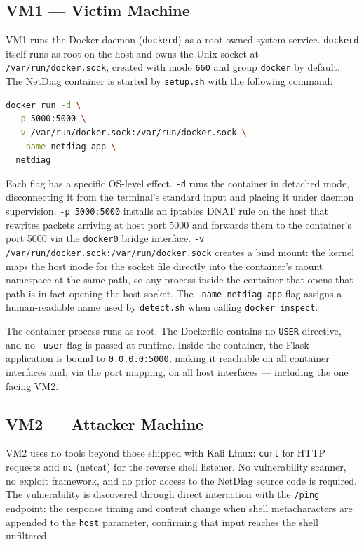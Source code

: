 \subsection{VM1 --- Victim Machine}

VM1 runs the Docker daemon (\texttt{dockerd}) as a root-owned system service.
\texttt{dockerd} itself runs as root on the host and owns the Unix socket at
\texttt{/var/run/docker.sock}, created with mode \texttt{660} and group
\texttt{docker} by default. The NetDiag container is started by
\texttt{setup.sh} with the following command:

\begin{lstlisting}[language=bash]
docker run -d \
  -p 5000:5000 \
  -v /var/run/docker.sock:/var/run/docker.sock \
  --name netdiag-app \
  netdiag
\end{lstlisting}

Each flag has a specific OS-level effect. \texttt{-d} runs the container in
detached mode, disconnecting it from the terminal's standard input and placing
it under daemon supervision. \texttt{-p 5000:5000} installs an iptables DNAT
rule on the host that rewrites packets arriving at host port 5000 and forwards
them to the container's port 5000 via the \texttt{docker0} bridge interface.
\texttt{-v /var/run/docker.sock:/var/run/docker.sock} creates a bind mount: the
kernel maps the host inode for the socket file directly into the container's
mount namespace at the same path, so any process inside the container that opens
that path is in fact opening the host socket. The \texttt{--name netdiag-app}
flag assigns a human-readable name used by \texttt{detect.sh} when calling
\texttt{docker inspect}.

The container process runs as root. The Dockerfile contains no \texttt{USER}
directive, and no \texttt{--user} flag is passed at runtime. Inside the
container, the Flask application is bound to \texttt{0.0.0.0:5000}, making it
reachable on all container interfaces and, via the port mapping, on all host
interfaces --- including the one facing VM2.

\subsection{VM2 --- Attacker Machine}

VM2 uses no tools beyond those shipped with Kali Linux: \texttt{curl} for HTTP
requests and \texttt{nc} (netcat) for the reverse shell listener. No
vulnerability scanner, no exploit framework, and no prior access to the NetDiag
source code is required. The vulnerability is discovered through direct
interaction with the \texttt{/ping} endpoint: the response timing and content
change when shell metacharacters are appended to the \texttt{host} parameter,
confirming that input reaches the shell unfiltered.


